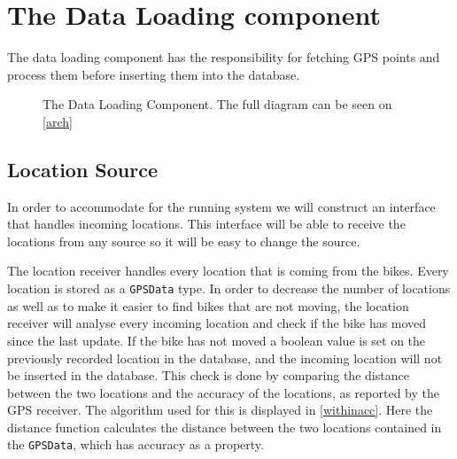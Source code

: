 \section{The Data Loading component}
The data loading component has the responsibility for fetching GPS points and process them before inserting them into the database.

\begin{figure}	\centering
{}
\caption{The Data Loading Component. The full diagram can be seen on \cref{arch}}
\label{dataloadingcomponent}
\end{figure}

\subsection{Location Source}\label{design:location_source}
In order to accommodate for the running system we will construct an interface that handles incoming locations.
This interface will be able to receive the locations from any source so it will be easy to change the source.

The location receiver handles every location that is coming from the bikes.
Every location is stored as a \texttt{GPSData} type.
In order to decrease the number of locations as well as to make it easier to find bikes that are not moving, the location receiver will analyse every incoming location and check if the bike has moved since the last update.
If the bike has not moved a boolean value is set on the previously recorded location in the database, and the incoming location will not be inserted in the database.
This check is done by comparing the distance between the two locations and the accuracy of the locations, as reported by the GPS receiver.
The algorithm used for this is displayed in \cref{withinacc}.
Here the distance function calculates the distance between the two locations contained in the \texttt{GPSData}, which has accuracy as a property.

